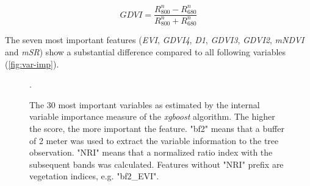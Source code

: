 \documentclass[review]{elsarticle}
\begin{document}
\begin{equation}
	GDVI = \frac{R_{800}^n-R_{680}^n}{R_{800}^n+R_{680}^n}
\end{equation}

\bigbreak

\noindent The seven most important features (\textit{EVI}, \textit{GDVI4}, \textit{D1}, \textit{GDVI3}, \textit{GDVI2}, \textit{mNDVI} and \textit{mSR}) show a substantial difference compared to all following variables (\autoref{fig:var-imp}).

\begin{figure} [b!]
	\begin{center}
		\caption{The 30 most important variables as estimated by the internal variable importance measure of the \textit{xgboost} algorithm. The higher the score, the more important the feature.
			"bf2" means that a buffer of 2 meter was used to extract the variable information to the tree observation. "NRI" means that a normalized ratio index with the subsequent bands was calculated. Features without "NRI" prefix are vegetation indices, e.g. "bf2\_EVI".}. %
		\label{fig:var-imp}
	\end{center}
\end{figure}
\end{document}
